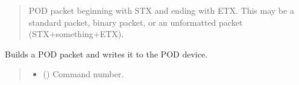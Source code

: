 \documentclass[letterpaper,10pt,english]{sphinxmanual}
\begin{document}
\begin{fulllineitems}
\begin{fulllineitems}
\begin{quote}
\begin{description}
\begin{itemize}
\end{itemize}

\sphinxAtStartPar
POD packet beginning with STX and ending with ETX. This may be a                 standard packet, binary packet, or an unformatted packet (STX+something+ETX).

\sphinxAtStartPar
{\hyperref[\detokenize{PodApi.Packets:PodApi.Packets.Packet.Packet}]{}}

\end{description}\end{quote}

\end{fulllineitems}


\begin{fulllineitems}
\label{\detokenize{PodApi.Devices:PodApi.Devices.PodDevice_8401HR.Pod8401HR.WritePacket}}
\pysigstartsignatures
{}
\pysigstopsignatures
\sphinxAtStartPar
Builds a POD packet and writes it to the POD device.
\begin{quote}\begin{description}
\begin{itemize}
\item {} 
\sphinxAtStartPar
{} (\sphinxstyleliteralemphasis{\sphinxupquote{ | }}) \textendash{} Command number.


\end{itemize}
\end{description}
\end{quote}
\end{fulllineitems}
\end{fulllineitems}
\end{document}
